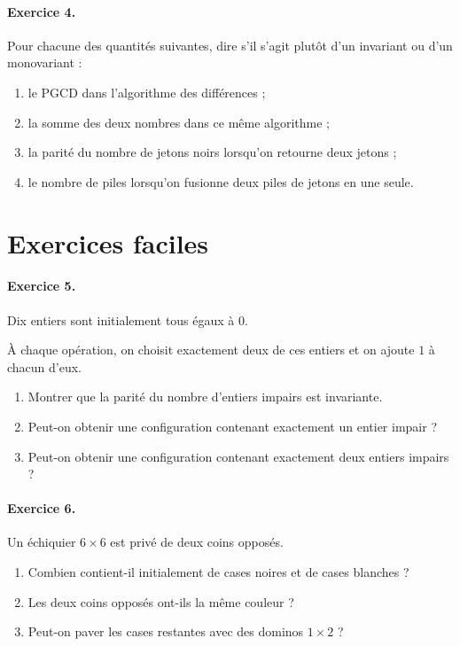 \paragraph{Exercice 4.}
Pour chacune des quantités suivantes, dire s'il s'agit plutôt d'un invariant ou
d'un monovariant :

\begin{enumerate}
    \item le PGCD dans l'algorithme des différences ;
    \item la somme des deux nombres dans ce même algorithme ;
    \item la parité du nombre de jetons noirs lorsqu'on retourne deux jetons ;
    \item le nombre de piles lorsqu'on fusionne deux piles de jetons en une seule.
\end{enumerate}

\section{Exercices faciles}

\paragraph{Exercice 5.}
Dix entiers sont initialement tous égaux à \(0\).

À chaque opération, on choisit exactement deux de ces entiers et on ajoute
\(1\) à chacun d'eux.

\begin{enumerate}
    \item Montrer que la parité du nombre d'entiers impairs est invariante.
    \item Peut-on obtenir une configuration contenant exactement un entier
    impair ?
    \item Peut-on obtenir une configuration contenant exactement deux entiers
    impairs ?
\end{enumerate}

\paragraph{Exercice 6.}
Un échiquier \(6\times6\) est privé de deux coins opposés.

\begin{enumerate}
    \item Combien contient-il initialement de cases noires et de cases blanches ?
    \item Les deux coins opposés ont-ils la même couleur ?
    \item Peut-on paver les cases restantes avec des dominos \(1\times2\) ?
\end{enumerate}

